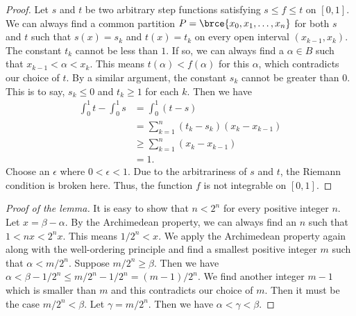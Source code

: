 \documentclass[a4paper]{article}
\begin{document}
\begin{enumerate}
  \begin{proof}
    Let \(s\) and \(t\) be two arbitrary step functions satisfying
    \(s \le f \le t\) on \([0, 1]\).  We can always find a common
    partition \(P = \brce{x_0, x_1, \dotsc, x_n}\) for both \(s\) and
    \(t\) such that \(s(x) = s_k\) and \(t(x) = t_k\) on every open
    interval \((x_{k-1}, x_k)\).  The constant \(t_k\) cannot be less than
    \(1\).  If so, we can always find a \(\alpha \in B\) such that
    \(x_{k-1} < \alpha < x_k\).  This means \(t(\alpha) < f(\alpha)\) for
    this \(\alpha\), which contradicts our choice of \(t\).  By a similar
    argument, the constant \(s_k\) cannot be greater than \(0\).  This is
    to say, \(s_k \le 0\) and \(t_k \ge 1\) for each \(k\).  Then we have
    \begin{align*}
      \int_0^1 t - \int_0^1 s
        &= \int_0^1 (t-s) \\
        &= \sum_{k=1}^n (t_k - s_k)(x_k - x_{k-1}) \\
        &\ge \sum_{k=1}^n (x_k - x_{k-1}) \\
        &= 1.
    \end{align*}
    Choose an \(\epsilon\) where \(0 < \epsilon < 1\).  Due to the
    arbitrariness of \(s\) and \(t\), the Riemann condition is broken
    here.  Thus, the function \(f\) is not integrable on \([0, 1]\).
  \end{proof}

  \begin{proof}[Proof of the lemma]
    It is easy to show that \(n < 2^n\) for every positive integer \(n\).
    Let \(x = \beta - \alpha\).  By the Archimedean property, we can
    always find an \(n\) such that \(1 < nx < 2^n x\).  This means
    \(1/2^n < x\).  We apply the Archimedean property again along with the
    well-ordering principle and find a smallest positive integer \(m\)
    such that \(\alpha < m/2^n\).  Suppose \(m/2^n \ge \beta\).  Then we
    have \(\alpha < \beta - 1/2^n \le m/2^n - 1/2^n = (m-1)/2^n\).  We
    find another integer \(m-1\) which is smaller than \(m\) and this
    contradicts our choice of \(m\).  Then it must be the case
    \(m/2^n < \beta\).  Let \(\gamma = m/2^n\).  Then we have
    \(\alpha < \gamma < \beta\).
  \end{proof}
\end{enumerate}
\end{document}

